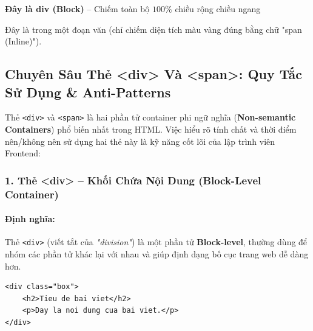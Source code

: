 \documentclass[11pt,oneside]{book}
\newcommand{\codeinline}[1]{\textcolor{accentOrange}{\texttt{#1}}}
\newcommand{\term}[1]{\textbf{\textcolor{primaryBlue}{#1}}}
\begin{document}
\begin{browserWindow}
\begin{tcolorbox}[enhanced, colback=blue!15, colframe=blue!30, arc=4pt, boxrule=0.6pt, top=4pt, bottom=4pt, left=8pt, right=8pt, before=\par\vspace{3pt}, after=\par\vspace{3pt}]
\sffamily\small\textbf{Đây là div (Block)} -- Chiếm toàn bộ $100\%$ chiều rộng chiều ngang
\end{tcolorbox}
\par\vspace{3pt}
\sffamily\small
Đây là  trong một đoạn văn (chỉ chiếm diện tích màu vàng đúng bằng chữ "span (Inline)").
\end{browserWindow}
\clearpage
\subsection{Chuyên Sâu Thẻ <div> Và <span>: Quy Tắc Sử Dụng \& Anti-Patterns}

Thẻ \codeinline{<div>} và \codeinline{<span>} là hai phần tử container phi ngữ nghĩa (\term{Non-semantic Containers}) phổ biến nhất trong HTML. Việc hiểu rõ tính chất và thời điểm nên/không nên sử dụng hai thẻ này là kỹ năng cốt lõi của lập trình viên Frontend:

\subsubsection{1. Thẻ <div> -- Khối Chứa Nội Dung (Block-Level Container)}

\paragraph{Định nghĩa:}
Thẻ \codeinline{<div>} (viết tắt của \textit{"division"}) là một phần tử \term{Block-level}, thường dùng để nhóm các phần tử khác lại với nhau và giúp định dạng bố cục trang web dễ dàng hơn.

\begin{codeWindow}
\begin{lstlisting}[language=HTML5]
<div class="box">
    <h2>Tieu de bai viet</h2>
    <p>Day la noi dung cua bai viet.</p>
</div>
\end{lstlisting}
\end{codeWindow}
\end{document}

